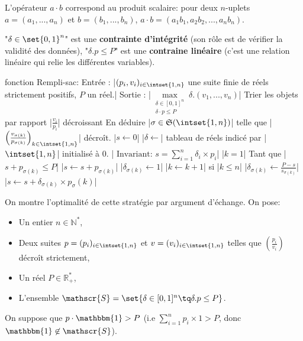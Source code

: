\documentclass{scrartcl}
\begin{document}
					\rem L'opérateur $a \cdot b$ correspond au produit scalaire: pour deux $n$-uplets $a = (a_1,...,a_n)$ et $b = (b_1,...,b_n)$, 
					$a\cdot b = (a_1b_1,a_2b_2,...,a_nb_n)$.

					\rem "$\delta \in \set{0,1}^n$" est une \textbf{contrainte d'intégrité} (son rôle est de vérifier la validité des données), 
					"$\delta.p \leq P$" est une \textbf{contraine linéaire} (c'est une relation linéaire qui relie les différentes variables).

						\begin{algotext}
fonction Rempli-sac:
	Entrée : |$(p_i,v_i)_{i \in \intset{1,n}}$ une suite finie de réels strictement positifs, $P$ un réel.|
	Sortie : |$\max\limits_{\substack{\delta \in [0,1]^n \\ \delta\cdot p \leq P}} \delta.(v_1,...,v_n)$|
	Trier les objets par rapport |$\frac{v_i}{p_i}$| décroissant
	En déduire |$\sigma \in \mathfrak{S}(\intset{1,n})$| telle que |$\left(\frac{v_{\sigma(k)}}{p_{\sigma(k)}}\right)_{k\in\intset{1,n}}$| décroît.
	|$s \leftarrow 0$|
	|$\delta \leftarrow $| tableau de réels indicé par |$\intset{1,n}$| initialisé à 0.
									|\(\text{ Invariant: } s = \sum_{i=1}^n \delta_i \times p_i\)|
	|$k = 1$|
	Tant que |$s+ p_{\sigma(k)} \leq P$|
		|$s \leftarrow  s + p_{\sigma(k)}$|
		|$\delta_{\sigma(k)} \leftarrow 1$|
		|$k \leftarrow k+1$|
	si |$k \leq n$|
		|$\delta_{\sigma(k)} \leftarrow \frac{P-s}{s_{\sigma(k)}}$|
		|$s \leftarrow s+ \delta_{\sigma(k)}\times p_\sigma(k)$|
						\end{algotext}

					On montre l'optimalité de cette stratégie par argument d'échange. On pose:
					\begin{multicols}{2}
					\begin{itemize}
						\item Un entier $n \in \mathbb{N}^*$,
						\item Deux suites $p = (p_i)_{i\in\intset{1,n}}$ et $v = (v_i)_{i \in \intset{1,n}}$ telles que $\left(\frac{p_i}{v_i}\right)$ décroît strictement,
						\item Un réel $P \in \mathbb{R}^*_+$,
						\item L'ensemble $\mathscr{S} = \set{\delta \in [0,1]^n \tq \delta.p \leq P}$.
					\end{itemize}
					\end{multicols}
					On suppose que $p\cdot\mathbbm{1} > P$ (i.e $\sum_{i=1}^n p_{i}\times 1 > P$, donc $\mathbbm{1} \not\in \mathscr{S}$). 
\end{document}
